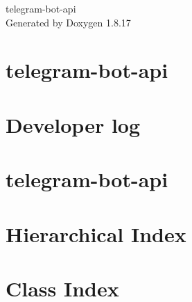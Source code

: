 \let\mypdfximage\pdfximage\def\pdfximage{\immediate\mypdfximage}\documentclass[twoside]{book}
\newcommand{\+}{\discretionary{\mbox{\scriptsize$\hookleftarrow$}}{}{}}
\newcommand{\clearemptydoublepage}{%
  \newpage{\pagestyle{empty}\cleardoublepage}%
}
\begin{document}
\hypersetup{pageanchor=false,
             bookmarksnumbered=true,
             pdfencoding=unicode
            }
\begin{titlepage}
\vspace*{7cm}
\begin{center}%
{\Large telegram-\/bot-\/api }\\
\vspace*{1cm}
{\large Generated by Doxygen 1.8.17}\\
\end{center}
\end{titlepage}
\clearemptydoublepage
{}
\tableofcontents
\clearemptydoublepage
{}
\hypersetup{pageanchor=true}

\chapter{telegram-\/bot-\/api}
\label{index}\hypertarget{index}{}
\chapter{Developer log}
\label{dev-log}

\chapter{telegram-\/bot-\/api}
\label{md_README}

\chapter{Hierarchical Index}

\chapter{Class Index}

\end{document}
